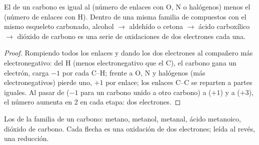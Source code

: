 \begin{proposition}\label{prop:b1:organic-redox:on-of-carbon}
El  de un carbono es igual al (número de enlaces con
O, N o halógenos) menos el (número de enlaces con H). Dentro de una misma
familia de compuestos con el mismo esqueleto carbonado, alcohol $\to$
aldehído o cetona $\to$ ácido carboxílico $\to$ dióxido de carbono es una
serie de oxidaciones de dos electrones cada una.
\end{proposition}

\begin{proof}
Rompiendo todos los enlaces y dando los dos electrones al compañero más
electronegativo: del H (menos electronegativo que el C), el carbono gana
un electrón, carga $-1$ por cada C--H; frente a O, N y halógenos (más
electronegativos) pierde uno, $+1$ por enlace; los enlaces C--C se
reparten a partes iguales. Al pasar de  ($-1$ para un carbono
unido a otro carbono) a  ($+1$) y a  ($+3$), el número
aumenta en 2 en cada etapa: dos electrones.
\end{proof}

\begin{omfigure}

{\small Los  de la familia de un carbono: metano,
metanol, metanal, ácido metanoico, dióxido de carbono. Cada flecha es una
oxidación de dos electrones; leída al revés, una reducción.}
\end{omfigure}

